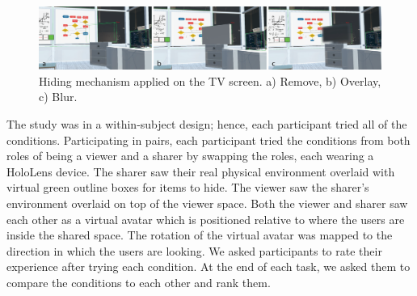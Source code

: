 \begin{figure}[ht]
    \begin{center}
    \includegraphics[width=\linewidth]{images/54-hiding-frontier18/images-01.png}
    \caption{Hiding mechanism applied on the TV screen. a) Remove, b) Overlay, c) Blur.}\label{fig:frontier18:hiding-mechanism}
    \end{center}
\end{figure}



The study was in a within-subject design; hence, each participant tried all of the conditions. Participating in pairs, each participant tried the conditions from both roles of being a viewer and a sharer by swapping the roles, each wearing a HoloLens device. The sharer saw their real physical environment overlaid with virtual green outline boxes for items to hide. The viewer saw the sharer's environment overlaid on top of the viewer space. Both the viewer and sharer saw each other as a virtual avatar which is positioned relative to where the users are inside the shared space. The rotation of the virtual avatar was mapped to the direction in which the users are looking. We asked participants to rate their experience after trying each condition. At the end of each task, we asked them to compare the conditions to each other and rank them. 


